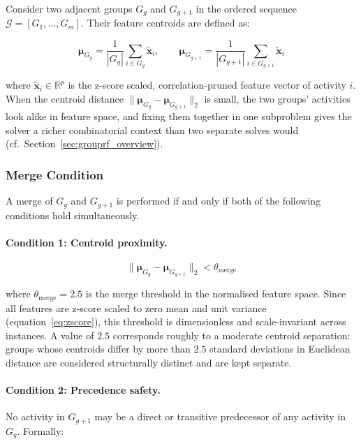 Consider two adjacent groups $G_g$ and $G_{g+1}$ in the
ordered sequence $\mathcal{G} = [G_1, \ldots, G_m]$. Their
feature centroids are defined as:

\begin{equation}
    \boldsymbol{\mu}_{G_g}
    = \frac{1}{|G_g|} \sum_{i \in G_g} \tilde{\mathbf{x}}_i,
    \qquad
    \boldsymbol{\mu}_{G_{g+1}}
    = \frac{1}{|G_{g+1}|} \sum_{i \in G_{g+1}}
      \tilde{\mathbf{x}}_i
    \label{eq:centroids}
\end{equation}

where $\tilde{\mathbf{x}}_i \in \mathbb{R}^p$ is the z-score
scaled, correlation-pruned feature vector of activity $i$.
When the centroid distance $\|\boldsymbol{\mu}_{G_g} -
\boldsymbol{\mu}_{G_{g+1}}\|_2$ is small, the two groups'
activities look alike in feature space, and fixing them
together in one subproblem gives the solver a richer
combinatorial context than two separate solves would (cf.\
Section~\ref{sec:grouprf_overview}).

\subsubsection{Merge Condition}
\label{subsubsec:merge_condition}

A merge of $G_g$ and $G_{g+1}$ is performed if and only if
both of the following conditions hold simultaneously.

\paragraph{Condition 1: Centroid proximity.}
\begin{equation}
    \|\boldsymbol{\mu}_{G_g} - \boldsymbol{\mu}_{G_{g+1}}\|_2
    < \theta_{\mathrm{merge}}
    \label{eq:merge_cond}
\end{equation}

where $\theta_{\mathrm{merge}} = 2.5$ is the merge threshold
in the normalised feature space. Since all features are
z-score scaled to zero mean and unit variance
(equation~\ref{eq:zscore}), this threshold is dimensionless
and scale-invariant across instances. A value of $2.5$
corresponds roughly to a moderate centroid separation:
groups whose centroids differ by more than $2.5$ standard
deviations in Euclidean distance are considered structurally
distinct and are kept separate.

\paragraph{Condition 2: Precedence safety.}
No activity in $G_{g+1}$ may be a direct or transitive
predecessor of any activity in $G_g$. Formally:

